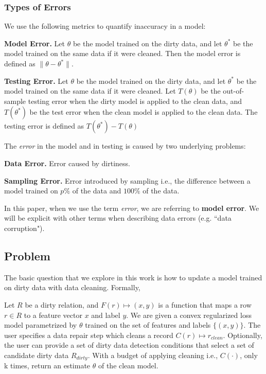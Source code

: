 \subsubsection{Types of Errors}
We use the following metrics to quantify inaccuracy in a model:

\vspace{0.25em}

\noindent\textbf{Model Error. } Let $\theta$ be the model trained on the dirty data, and let $\theta^*$ be the model trained on the same data if it were cleaned. Then the model error is defined as $\|\theta - \theta^*\|$.

\vspace{0.25em}

\noindent\textbf{Testing Error. } Let $\theta$ be the model trained on the dirty data, and let $\theta^*$ be the model trained on the same data if it were cleaned. Let $T(\theta)$ be the out-of-sample testing error when the dirty model is applied to the clean data, and $T(\theta^*)$ be the test error when the clean model is applied to the clean data. The testing error is defined as $T(\theta^*) - T(\theta)$

\vspace{0.5em}

\noindent The \emph{error} in the model and in testing is caused by two underlying problems:

\vspace{0.25em}

\noindent\textbf{Data Error. } Error caused by dirtiness.

\vspace{0.25em}

\noindent\textbf{Sampling Error. } Error introduced by sampling i.e., the difference between a model trained on $p\%$ of the data and $100\%$ of the data.

\vspace{0.25em}

In this paper, when we use the term \emph{error}, we are referring to \textbf{model error}.
We will be explicit with other terms when describing data errors (e.g. ``data corruption").

\subsection{\sys Problem}
The basic question that we explore in this work is how to update a model trained on dirty data with data cleaning. Formally,

\begin{problem}\label{activeclean}\sloppy
Let $R$ be a dirty relation, and $F(r) \mapsto (x,y)$ is a function that maps
a row $r \in R$ to a feature vector $x$ and label $y$.
We are given a convex regularized loss model parametrized
by $\theta$ trained on the set of features and labels $\{(x,y)\}$.
The user specifies a data repair step which cleans a record 
$C(r) \mapsto r_{clean}$.
Optionally, the user can provide a set of dirty data detection conditions that select 
a set of candidate dirty data $R_{dirty}$.
With a budget of applying cleaning i.e., $C(\cdot)$, only k times, return an estimate $\hat{\theta}$ of the clean model.
\end{problem}

